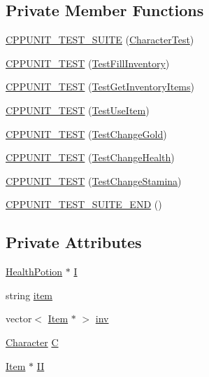 \subsection*{Private Member Functions}
\begin{DoxyCompactItemize}
\item 
\hyperlink{classCharacterTest_a9882f04c10eedb154b93bdeb19144182}{C\-P\-P\-U\-N\-I\-T\-\_\-\-T\-E\-S\-T\-\_\-\-S\-U\-I\-T\-E} (\hyperlink{classCharacterTest}{Character\-Test})
\item 
\hyperlink{classCharacterTest_ac9e2e2e32564afe8b256b4fd0b0e1867}{C\-P\-P\-U\-N\-I\-T\-\_\-\-T\-E\-S\-T} (\hyperlink{classCharacterTest_a348e663ab1846bbe64770dfd437bea49}{Test\-Fill\-Inventory})
\item 
\hyperlink{classCharacterTest_ab86d157d42dcc5acbda6e67308fa879a}{C\-P\-P\-U\-N\-I\-T\-\_\-\-T\-E\-S\-T} (\hyperlink{classCharacterTest_a0fae073fe364d5bb09e1488505f2f247}{Test\-Get\-Inventory\-Items})
\item 
\hyperlink{classCharacterTest_ae07c31a496c77343ff1afe5d6666619a}{C\-P\-P\-U\-N\-I\-T\-\_\-\-T\-E\-S\-T} (\hyperlink{classCharacterTest_a6510093a5bfccb8d325e00e0a15a81c2}{Test\-Use\-Item})
\item 
\hyperlink{classCharacterTest_ab8d48b1d88ca6958c7a702f6788e9b91}{C\-P\-P\-U\-N\-I\-T\-\_\-\-T\-E\-S\-T} (\hyperlink{classCharacterTest_a318991be56057b2587fcf357e13409ab}{Test\-Change\-Gold})
\item 
\hyperlink{classCharacterTest_a06162254e38a314ea52101a2e3f6271f}{C\-P\-P\-U\-N\-I\-T\-\_\-\-T\-E\-S\-T} (\hyperlink{classCharacterTest_a1e3ff758e3a47589ac31297cf62db9c4}{Test\-Change\-Health})
\item 
\hyperlink{classCharacterTest_ada430d4138cf07e076b4288602d425b8}{C\-P\-P\-U\-N\-I\-T\-\_\-\-T\-E\-S\-T} (\hyperlink{classCharacterTest_ac61fb4a8c3c9b4a3f1d8e70856d4c9e0}{Test\-Change\-Stamina})
\item 
\hyperlink{classCharacterTest_acbb1bb277e098afa5ba3ea70c3204a41}{C\-P\-P\-U\-N\-I\-T\-\_\-\-T\-E\-S\-T\-\_\-\-S\-U\-I\-T\-E\-\_\-\-E\-N\-D} ()
\end{DoxyCompactItemize}
\subsection*{Private Attributes}
\begin{DoxyCompactItemize}
\item 
\hyperlink{classHealthPotion}{Health\-Potion} $\ast$ \hyperlink{classCharacterTest_a2a5e0fd6dd04bf1265ac5b1fad798a79}{I}
\item 
string \hyperlink{classCharacterTest_aee8b109b66e2f22ba5de6abaaba47160}{item}
\item 
vector$<$ \hyperlink{classItem}{Item} $\ast$ $>$ \hyperlink{classCharacterTest_a23af9da0d443fb16273ed269b8a91e8b}{inv}
\item 
\hyperlink{classCharacter}{Character} \hyperlink{classCharacterTest_a2afd29afdeb90cbac6ac18a71ef7e23a}{C}
\item 
\hyperlink{classItem}{Item} $\ast$ \hyperlink{classCharacterTest_a168ed4a5b98f8048326d22f2486457a6}{I\-I}
\end{DoxyCompactItemize}



